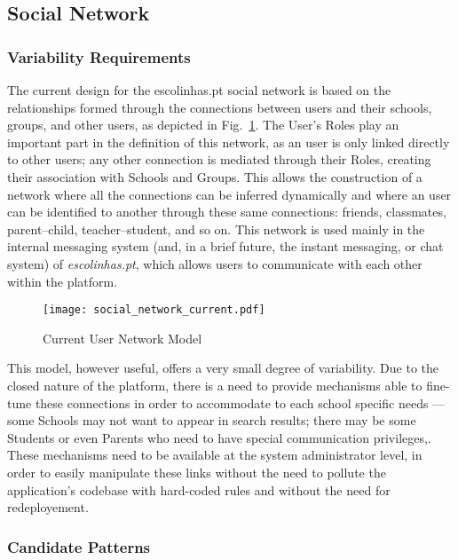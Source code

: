 \subsection{Social Network}\label{sec:fa_social_network}

\subsubsection{Variability Requirements}\label{sec:fa_social_network_variability_requirements}

The current design for the escolinhas.pt social network is based on the relationships formed through the connections between users and their schools, groups, and other users, as depicted in Fig.~\ref{fig:social_network_current}. The User's Roles play an important part in the definition of this network, as an user is only linked directly to other users; any other connection is mediated through their Roles, creating their association with Schools and Groups. This allows the construction of a network where all the connections can be inferred dynamically and where an user can be identified to another through these same connections: friends, classmates, parent--child, teacher--student, and so on. This network is used mainly in the internal messaging system (and, in a brief future, the instant messaging, or chat system) of \emph{escolinhas.pt}, which allows users to communicate with each other within the platform.

\begin{figure}[H]
  \centering
  \texttt{[image: social\_network\_current.pdf]}
  \caption{Current User Network Model}
  \label{fig:social_network_current}
\end{figure}

This model, however useful, offers a very small degree of variability. Due to the closed nature of the platform, there is a need to provide mechanisms able to fine-tune these connections in order to accommodate to each school specific needs --- some Schools may not want to appear in search results; there may be some Students or even Parents who need to have special communication privileges,. These mechanisms need to be available at the system administrator level, in order to easily manipulate these links without the need to pollute the application's codebase with hard-coded rules and without the need for redeployement.

\subsubsection{Candidate Patterns}\label{sec:fa_social_network_candidate_patterns}

